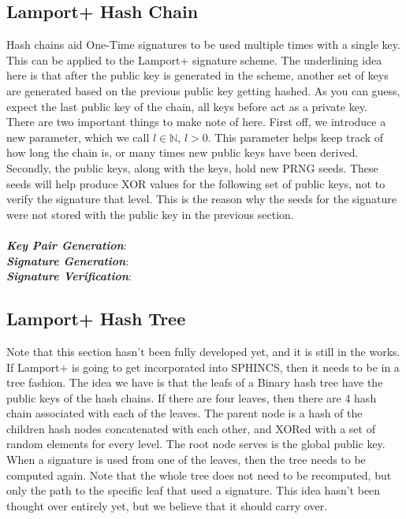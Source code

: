 \documentclass[]{scrartcl}
\begin{document}
\subsection*{Lamport+ Hash Chain}
Hash chains aid One-Time signatures to be used multiple times with a single key. This can be applied to the Lamport+ signature scheme. The underlining idea here is that after the public key is generated in the scheme, another set of keys are generated based on the previous public key getting hashed. As you can guess, expect the last public key of the chain, all keys before act as a private key.\\
There are two important things to make note of here. First off, we introduce a new parameter, which we call $l \in \mathbb{N}$, $l > 0$. This parameter helps keep track of how long the chain is, or many times new public keys have been derived. Secondly, the public keys, along with the keys, hold new PRNG seeds. These seeds will help produce XOR values for the following set of public keys, not to verify the signature that level. This is the reason why the seeds for the signature were not stored with the public key in the previous section.\\ \\
\textbf{\textit{Key Pair Generation}}: \\
\textbf{\textit{Signature Generation}}: \\
\textbf{\textit{Signature Verification}}: 


\subsection*{Lamport+ Hash Tree}
Note that this section hasn't been fully developed yet, and it is still in the works. If Lamport+ is going to get incorporated into SPHINCS, then it needs to be in a tree fashion. The idea we have is that the leafs of a Binary hash tree have the public keys of the hash chains. If there are four leaves, then there are 4 hash chain associated with each of the leaves. The parent node is a hash of the children hash nodes concatenated with each other, and XORed with a set of random elements for every level. The root node serves is the global public key.\\
When a signature is used from one of the leaves, then the tree needs to be computed again. Note that the whole tree does not need to be recomputed, but only the path to the specific leaf that used a signature. This idea hasn't been thought over entirely yet, but we believe that it should carry over.
\end{document}
